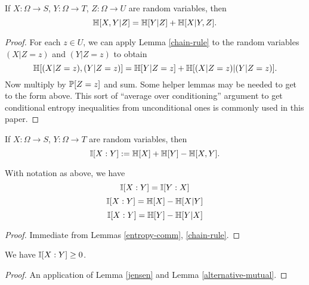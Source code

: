 \begin{lemma}\label{conditional-chain-rule}
  \leanok
  If $X: \Omega \to S$, $Y: \Omega \to T$, $Z: \Omega \to U$ are random variables, then
$$ \mathbb{H}[X, Y | Z ] = \mathbb{H}[Y | Z] + \mathbb{H}[X|Y, Z].$$
\end{lemma}

\begin{proof}  \leanok
   For each $z \in U$, we can apply Lemma \ref{chain-rule} to the random variables $(X|Z=z)$ and $(Y|Z=z)$ to obtain
  $$ \mathbb{H}[ (X|Z=z),(Y|Z=z) ] = \mathbb{H}[Y|Z=z] + \mathbb{H}[(X|Z=z)|(Y|Z=z)].$$
  Now multiply by $\mathbb{P}[Z=z]$ and sum.  Some helper lemmas may be needed to get to the form above.  This sort of ``average over conditioning'' argument to get conditional entropy inequalities from unconditional ones is commonly used in this paper.
\end{proof}

\begin{definition}
  \label{information-def}
  \leanok
  If $X: \Omega \to S$, $Y: \Omega \to T$ are random variables, then
  $$\mathbb{I}[X : Y] := \mathbb{H}[X] + \mathbb{H}[Y] - \mathbb{H}[X,Y].$$
\end{definition}

\begin{lemma}
  \label{alternative-mutual}
  \leanok
  With notation as above, we have
  $$  \mathbb{I}[X : Y] = \mathbb{I}[Y:X]$$
  $$  \mathbb{I}[X : Y] = \mathbb{H}[X] - \mathbb{H}[X|Y]$$
  $$  \mathbb{I}[X : Y] = \mathbb{H}[Y] - \mathbb{H}[Y|X]$$
\end{lemma}

\begin{proof}
  \leanok
  Immediate from Lemmas \ref{entropy-comm}, \ref{chain-rule}.
\end{proof}

\begin{lemma}
  \label{mutual-nonneg}
  \leanok
  We have $\mathbb{I}[X:Y] \geq 0$.
\end{lemma}

\begin{proof}  \leanok An application of Lemma \ref{jensen} and Lemma \ref{alternative-mutual}.
\end{proof}

